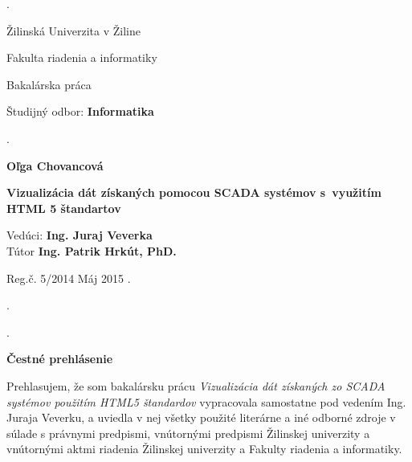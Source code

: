 \begin{titlepage}
\phantom.

\bigskip

\begin{center}
{\sc\LARGE Žilinská Univerzita v Žiline}
\medskip

{\sc\Large Fakulta riadenia a informatiky}

\vfill\vfill\vfill\vfill

{\sc\LARGE Bakalárska práca}

\medskip

{\large Študijný odbor: {\bf Informatika}}
\end{center}


\vfill\vfill\vfill\vfill


\phantom.\hfill

\begin{center}
{\large\bf Oľga Chovancová}

\medskip

{\large\bf Vizualizácia dát získaných pomocou SCADA systémov s~využitím HTML 5 štandartov}

\medskip

Vedúci: {\bf Ing. Juraj Veverka}\\
Tútor	\textbf{Ing. Patrik Hrkút, PhD.}
\medskip
 
\hfill
Reg.č. 5/2014
\hfill
Máj 2015
\hfill\phantom.
\end{center}

\hspace{1.7cm}\phantom.

\vspace{2.9cm}

\phantom.
\end{titlepage}




\newpage

\centerline{\bf Čestné prehlásenie}

\vspace{2em}

\noindent
Prehlasujem, že som bakalársku prácu \textit{Vizualizácia dát získaných zo SCADA systémov použitím HTML5 štandardov} vypracovala samostatne pod vedením Ing. Juraja Veverku, a uviedla v nej všetky použité literárne a iné odborné zdroje v súlade s právnymi predpismi, vnútornými predpismi Žilinskej univerzity a vnútornými aktmi riadenia Žilinskej univerzity a Fakulty riadenia a informatiky.

